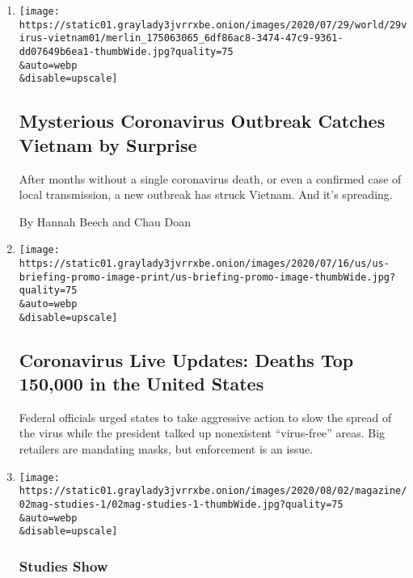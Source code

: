 \begin{enumerate}
\def\labelenumi{\arabic{enumi}.}
\item
  \href{/2020/07/29/world/asia/coronavirus-vietnam.html}{}

  \texttt{[image: https://static01.graylady3jvrrxbe.onion/images/2020/07/29/world/29virus-vietnam01/merlin\_175063065\_6df86ac8-3474-47c9-9361-dd07649b6ea1-thumbWide.jpg?quality=75\\\&auto=webp\\\&disable=upscale]}

  \hypertarget{mysterious-coronavirus-outbreak-catches-vietnam-by-surprise}{%
  \subsection{Mysterious Coronavirus Outbreak Catches Vietnam by
  Surprise}\label{mysterious-coronavirus-outbreak-catches-vietnam-by-surprise}}

  After months without a single coronavirus death, or even a confirmed
  case of local transmission, a new outbreak has struck Vietnam. And
  it's spreading.

  By Hannah Beech and Chau Doan
\item
  \href{/2020/07/29/world/coronavirus-covid-19.html}{}

  \texttt{[image: https://static01.graylady3jvrrxbe.onion/images/2020/07/16/us/us-briefing-promo-image-print/us-briefing-promo-image-thumbWide.jpg?quality=75\\\&auto=webp\\\&disable=upscale]}

  \hypertarget{coronavirus-live-updates-deaths-top-150000-in-the-united-states}{%
  \subsection{Coronavirus Live Updates: Deaths Top 150,000 in the United
  States}\label{coronavirus-live-updates-deaths-top-150000-in-the-united-states}}

  Federal officials urged states to take aggressive action to slow the
  spread of the virus while the president talked up nonexistent
  ``virus-free'' areas. Big retailers are mandating masks, but
  enforcement is an issue.
\item
  \href{/2020/07/29/magazine/schools-reopening-covid.html}{}

  \texttt{[image: https://static01.graylady3jvrrxbe.onion/images/2020/08/02/magazine/02mag-studies-1/02mag-studies-1-thumbWide.jpg?quality=75\\\&auto=webp\\\&disable=upscale]}

  \hypertarget{studies-show}{%
  \subsubsection{Studies Show}\label{studies-show}}


\end{enumerate}
